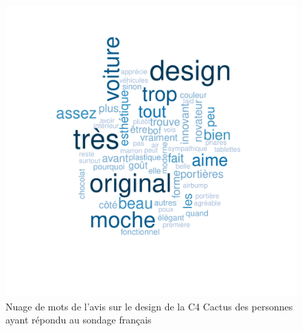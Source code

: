 \documentclass[12pt]{article}\usepackage[]{graphicx}\usepackage[]{color}
\makeatletter
\def\maxwidth{ %
  \ifdim\Gin@nat@width>\linewidth
    \linewidth
  \else
    \Gin@nat@width
  \fi
}
\newenvironment{knitrout}{}{} %
\makeatother
\begin{document}
\begin{knitrout}
\color{fgcolor}\begin{figure}[H]
\includegraphics[width=\maxwidth]{figure/design_fr-1} \caption[Nuage de mots de l'avis sur le design de la C4 Cactus des personnes ayant répondu au sondage français]{Nuage de mots de l'avis sur le design de la C4 Cactus des personnes ayant répondu au sondage français}\label{fig:design fr}
\end{figure}


\end{knitrout}
\end{document}
